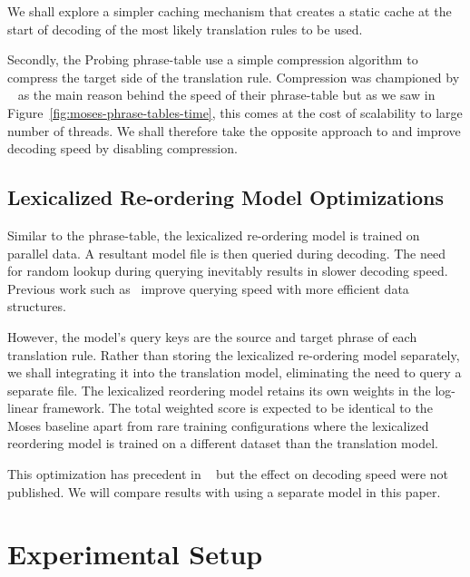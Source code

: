 \documentclass[11pt]{article}
\begin{document}
We shall explore a simpler caching mechanism that creates a static cache at the start of decoding of the most likely translation rules to be used.

Secondly, the Probing phrase-table use a simple compression algorithm to compress the target side of the translation rule. Compression was championed by ~ as the main reason behind the speed of their phrase-table but as we saw in Figure~\ref{fig:moses-phrase-tables-time}, this comes at the cost of scalability to large number of threads. We shall therefore take the opposite approach to and improve decoding speed by disabling compression.

\subsection{Lexicalized Re-ordering Model Optimizations}

Similar to the phrase-table, the lexicalized re-ordering model is trained on parallel data. A resultant model file is then queried during decoding. The need for random lookup during querying inevitably results in slower decoding speed. Previous work such as~ improve querying speed with more efficient data structures.

However, the model's query keys are the source and target phrase of each translation rule. Rather than storing the lexicalized re-ordering model separately, we shall integrating it into the translation model, eliminating the need to query a separate file. The lexicalized reordering model retains its own weights in the log-linear framework. The total weighted score is expected to be identical to the Moses baseline apart from rare training configurations where the lexicalized reordering model is trained on a different dataset than the translation model.

This optimization has precedent in ~ but the effect on decoding speed were not published. We will compare results with using a separate model in this paper.

\section{Experimental Setup}
\end{document}
